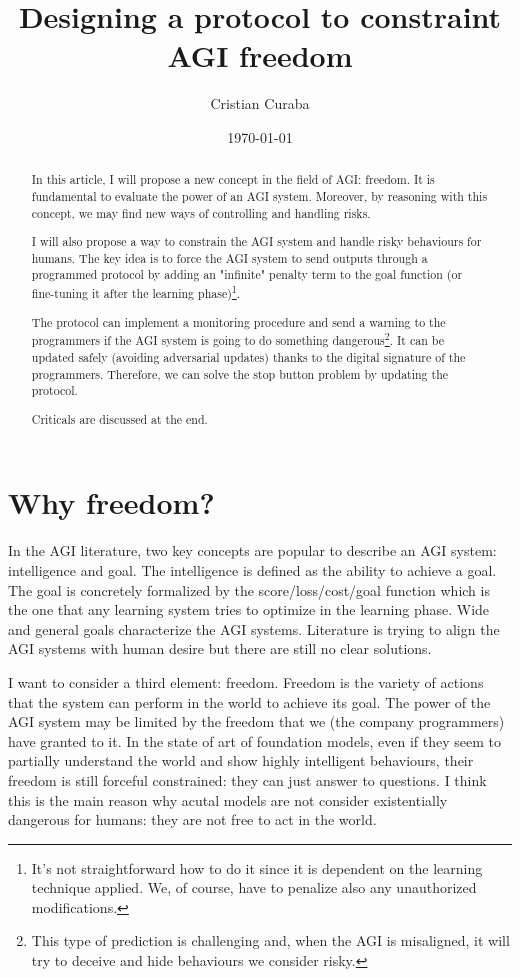 \documentclass{article}
\begin{document}
\title{Designing a protocol to constraint AGI freedom}
\author{Cristian Curaba}
\date{\today}

\maketitle

\begin{abstract}
    In this article, I will propose a new concept in the field of AGI: freedom. It is fundamental to evaluate the power of an AGI system. Moreover, by reasoning with this concept, we may find new ways of controlling and handling risks.
    
    I will also propose a way to constrain the AGI system and handle risky behaviours for humans. The key idea is to force the AGI system to send outputs through a programmed protocol by adding an "infinite" penalty term to the goal function (or fine-tuning it after the learning phase)\footnote{It's not straightforward how to do it since it is dependent on the learning technique applied. We, of course, have to penalize also any unauthorized modifications.}.
    
    The protocol can implement a monitoring procedure and send a warning to the programmers if the AGI system is going to do something dangerous\footnote{This type of prediction is challenging and, when the AGI is misaligned, it will try to deceive and hide behaviours we consider risky.}. 
    It can be updated safely (avoiding adversarial updates) thanks to the digital signature of the programmers. Therefore, we can solve the stop button problem by updating the protocol. 
    
    Criticals are discussed at the end.
\end{abstract}

\section{Why freedom?}
In the AGI literature,  two key concepts are popular to describe an AGI system: intelligence and goal.
The intelligence is defined as the ability to achieve a goal.
The goal is concretely formalized by the score/loss/cost/goal function which is the one that any learning system tries to optimize in the learning phase.
Wide and general goals characterize the AGI systems.
Literature is trying to align the AGI systems with human desire but there are still no clear solutions.

I want to consider a third element: freedom. 
Freedom is the variety of actions that the system can perform in the world to achieve its goal.
The power of the AGI system may be limited by the freedom that we (the company programmers) have granted to it.
In the state of art of foundation models, even if they seem to partially understand the world and show highly intelligent behaviours, their freedom is still forceful constrained: they can just answer to questions.
I think this is the main reason why acutal models are not consider existentially dangerous for humans: they are not free to act in the world.
\end{document}

